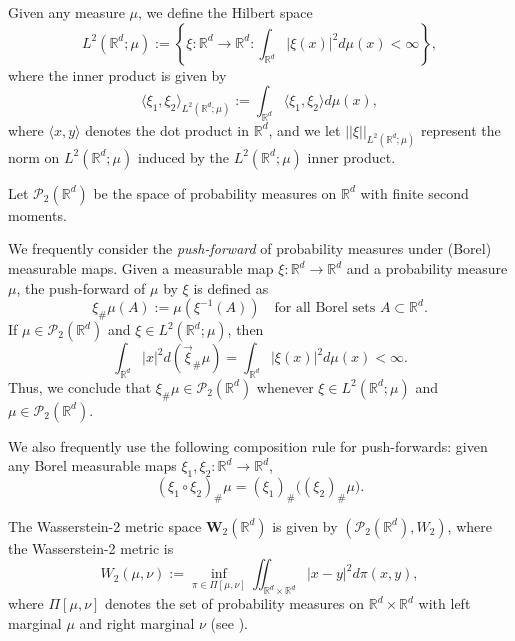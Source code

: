 \documentclass[11pt,a4paper]{amsart}
\newcommand{\1}{\mathds{1}}
\newcommand{\R}{{\mathbb R}}
\numberwithin{equation}{section}
\begin{document}
Given any measure $\mu$, we define the Hilbert space
\[
L^2(\R^d;\mu) := \left \{ \xi : \R^d \rightarrow \R^d : \int_{\R^d}|\xi(x)|^2 d\mu(x) < \infty \right \},
\]
where the inner product is given by
\[
\langle \xi_1,\xi_2 \rangle_{L^2(\R^d;\mu)} := \int_{\R^d} \langle \xi_1, \xi_2 \rangle d\mu(x),
\]
where $\langle x,y \rangle$ denotes the dot product in $\R^d$, and we let $||\xi||_{L^2(\R^d;\mu)}$ represent the norm on $L^2(\R^d;\mu)$ induced by the $L^2(\R^d;\mu)$ inner product.

\smallskip


\smallskip

Let $\mathcal{P}_2(\R^d)$ be the space of probability measures on $\R^d$ with finite second moments.

\smallskip

We frequently consider the \textit{push-forward} of probability measures under (Borel) measurable maps. Given a measurable map $\xi : \R^d \rightarrow \R^d$ and a probability measure $\mu$, the push-forward of $\mu$ by $\xi$ is defined as
\[
\xi_{\#} \mu(A) := \mu(\xi^{-1}(A)) \quad \text{for all Borel sets } A \subset \R^d.
\]
\noindent If $\mu \in \mathcal{P}_2(\R^d)$ and $\xi \in L^2(\R^d;\mu)$, then
\[
\int_{\R^d} |x|^2 d(\vec{\xi}_{\#} \mu) = \int_{\R^d} |\xi(x)|^2 d\mu(x) < \infty.
\]
Thus, we conclude that $\xi_{\#} \mu \in \mathcal{P}_2(\R^d)$ whenever $\xi \in L^2(\R^d;\mu)$ and $\mu \in \mathcal{P}_2(\R^d)$.

\smallskip

We also frequently use the following composition rule for push-forwards: given any Borel measurable maps $\xi_1,\xi_2 : \R^d \rightarrow \R^d$,
\[
(\xi_1 \circ \xi_2)_{\#} \mu = (\xi_1)_{\#} \big((\xi_2)_{\#} \mu\big).
\]

\smallskip

The Wasserstein-2 metric space $\mathbf{W}_2(\R^d)$ is given by $(\mathcal{P}_2(\R^d),W_2)$, where the Wasserstein-2 metric is 
\begin{equation}
W_2(\mu,\nu) := \inf_{\pi \in \Pi[\mu,\nu] } \iint_{\R^d \times \R^d} |x-y|^2 d\pi(x,y),
\label{W2_Def}
\end{equation}
where $\Pi[\mu,\nu]$ denotes the set of probability measures on $\R^d \times \R^d$ with left marginal $\mu$ and right marginal $\nu$ (see \cite{villani2021topics,santambrogio2015optimal}).
\end{document}
